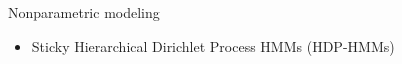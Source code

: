 \documentclass[final, 8pt]{beamer}
\newlength{\onecolwid}
\begin{document}
\begin{frame}
\begin{columns}
\begin{column}{\onecolwid}
\begin{block}{Nonparametric modeling}
\begin{itemize}
\begin{figure}[!p]
  \centering
  \texttt{[image: ../figure/igp\_abt\_fits]}
  \caption{\label{fig:igp_abt_fits}}
\end{figure}

\item Sticky Hierarchical Dirichlet Process HMMs (HDP-HMMs)
\end{itemize}
\end{block}

\begingroup
    \fontsize{14pt}{14pt}\selectfont
 
 
 \endgroup
\end{column}
\end{columns}

\end{frame}
\end{document}
